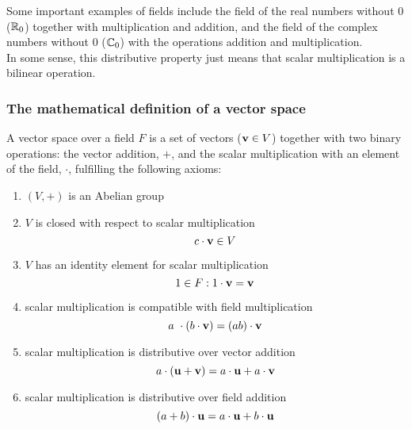         Some important examples of fields include the field of the real numbers without $0$ ($\mathbb{R}_0$) together with multiplication and addition, and the field of the complex numbers without $0$ ($\mathbb{C}_0$) with the operations addition and multiplication. \\

        In some sense, this distributive property just means that scalar multiplication is a bilinear operation. \\

    \subsubsection{The mathematical definition of a vector space}
        A vector space over a field $F$ is a set of vectors ($\vb{v} \in V$) together with two binary operations: the vector addition, $+$, and the scalar multiplication with an element of the field, $\cdot$, fulfilling the following axioms:
            \begin{enumerate}
                \item $(V,+)$ is an Abelian group

                \item $V$ is closed with respect to scalar multiplication
                \begin{equation}
                    c \cdot \vb{v} \in V
                \end{equation}

                \item $V$ has an identity element for scalar multiplication
                \begin{equation}
                    1 \in F: 1 \cdot \vb{v} = \vb{v}
                \end{equation}

                \item scalar multiplication is compatible with field multiplication
                \begin{equation}
                    a \cdot (b \cdot \vb{v}) = (ab) \cdot \vb{v}
                \end{equation}

                \item scalar multiplication is distributive over vector addition
                \begin{equation}
                    a \cdot (\vb{u} + \vb{v}) = a \cdot \vb{u} + a \cdot \vb{v}
                \end{equation}

                \item scalar multiplication is distributive over field addition
                \begin{equation}
                    (a + b) \cdot \vb{u} = a \cdot \vb{u} + b \cdot \vb{u}
                \end{equation}
            \end{enumerate}

